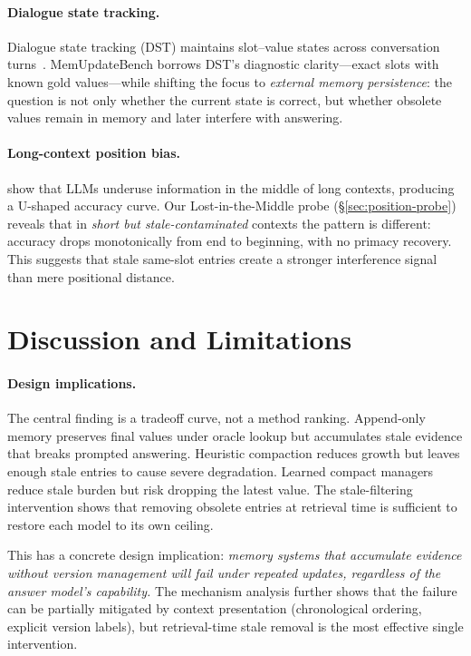 \documentclass[11pt,twocolumn]{article}
\begin{document}
\paragraph{Dialogue state tracking.}
Dialogue state tracking (DST) maintains slot--value states across conversation turns~\citep{dst_survey}.
MemUpdateBench borrows DST's diagnostic clarity---exact slots with known gold values---while shifting the focus to \emph{external memory persistence}: the question is not only whether the current state is correct, but whether obsolete values remain in memory and later interfere with answering.

\paragraph{Long-context position bias.}
\citet{lost_in_the_middle} show that LLMs underuse information in the middle of long contexts, producing a U-shaped accuracy curve.
Our Lost-in-the-Middle probe (\S\ref{sec:position-probe}) reveals that in \emph{short but stale-contaminated} contexts the pattern is different: accuracy drops monotonically from end to beginning, with no primacy recovery.
This suggests that stale same-slot entries create a stronger interference signal than mere positional distance.

\section{Discussion and Limitations}
\label{sec:limitations}

\paragraph{Design implications.}
The central finding is a tradeoff curve, not a method ranking.
Append-only memory preserves final values under oracle lookup but accumulates stale evidence that breaks prompted answering.
Heuristic compaction reduces growth but leaves enough stale entries to cause severe degradation.
Learned compact managers reduce stale burden but risk dropping the latest value.
The stale-filtering intervention shows that removing obsolete entries at retrieval time is sufficient to restore each model to its own ceiling.

This has a concrete design implication: \emph{memory systems that accumulate evidence without version management will fail under repeated updates, regardless of the answer model's capability.}
The mechanism analysis further shows that the failure can be partially mitigated by context presentation (chronological ordering, explicit version labels), but retrieval-time stale removal is the most effective single intervention.
\end{document}
